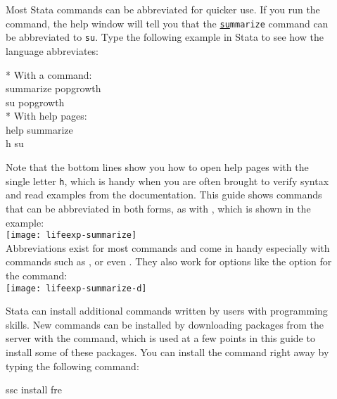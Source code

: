 \begin{description}
				\item[]%
				Most Stata commands can be abbreviated for quicker use. If you run the  command, the help window will tell you that the \texttt{\underline{su}mmarize} command can be abbreviated to \texttt{su}. Type the following example in Stata to see how the language abbreviates:%

		\begin{docspec}
			* With a command:\\%
			summarize popgrowth\\%
			su popgrowth\\[1em]%
			* With help pages:\\%
			help summarize\\%
			h su%
		\end{docspec}

	Note that the bottom lines show you how to open help pages with the single letter \texttt{h}, which is handy when you are often brought to verify syntax and read examples from the documentation. This guide shows commands that can be abbreviated in both forms, as with , which is shown in the example:\\[1em]%

		\texttt{[image: lifeexp-summarize]}\\[1em]

	Abbreviations exist for most commands and come in handy especially with commands such as ,  or even . They also work for options like the  option for the  command:\\[1em]%
	
		\texttt{[image: lifeexp-summarize-d]}\\[1em]

	\item[]%
	Stata can install additional commands written by users with programming skills. New commands can be installed by downloading packages from the \SSC server with the  command, which is used at a few points in this guide to install some of these packages. You can install the  command right away by typing the following command:%
		
	\begin{docspec}
		ssc install fre
	\end{docspec}
		

\end{description}
